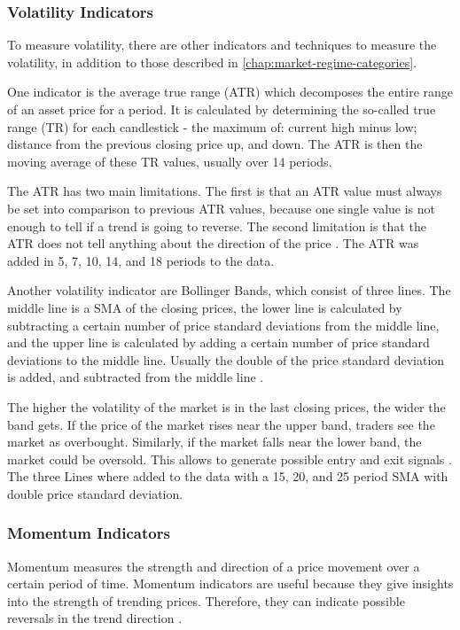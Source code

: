\subsubsection{Volatility Indicators}

To measure volatility, there are other indicators and techniques to measure the volatility, in addition to those described in \autoref{chap:market-regime-categories}.

One indicator is the average true range (ATR) which decomposes the entire range of an asset price for a period.
It is calculated by determining the so-called true range (TR) for each candlestick - the maximum of: current high minus low; distance from the previous closing price up, and down.
The ATR is then the moving average of these TR values, usually over 14 periods.

The ATR has two main limitations.
The first is that an ATR value must always be set into comparison to previous ATR values, because one single value is not enough to tell if a trend is going to reverse.
The second limitation is that the ATR does not tell anything about the direction of the price \cite{investopia-atr}.
The ATR was added in 5, 7, 10, 14, and 18 periods to the data.

Another volatility indicator are Bollinger Bands, which consist of three lines.
The middle line is a SMA of the closing prices, the lower line is calculated by subtracting a certain number of price standard deviations from the middle line, and the upper line is calculated by adding a certain number of price standard deviations to the middle line.
Usually the double of the price standard deviation is added, and subtracted from the middle line \cite{investopia-bb}.

The higher the volatility of the market is in the last closing prices, the wider the band gets.
If the price of the market rises near the upper band, traders see the market as overbought.
Similarly, if the market falls near the lower band, the market could be oversold.
This allows to generate possible entry and exit signals \cite{investopia-bb}.
The three Lines where added to the data with a 15, 20, and 25 period SMA with double price standard deviation.

\subsubsection{Momentum Indicators}

Momentum measures the strength and direction of a price movement over a certain period of time.
Momentum indicators are useful because they give insights into the strength of trending prices.
Therefore, they can indicate possible reversals in the trend direction \cite{investopia-momentum}.

